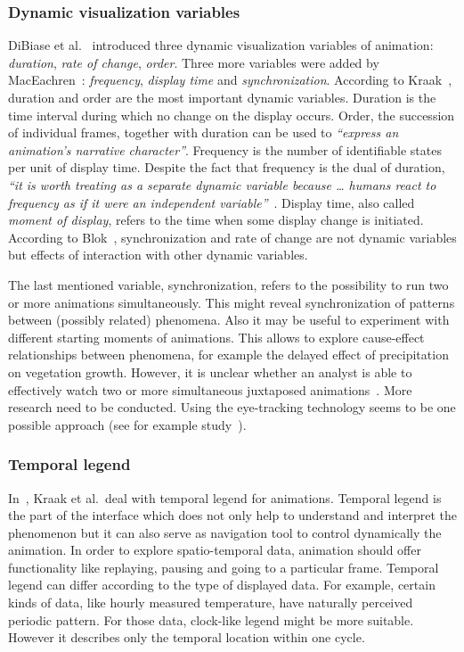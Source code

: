 \documentclass[a4paper,12pt,oneside]{book}
\begin{document}
\subsubsection{Dynamic visualization variables}
\label{sec:dynamicVariables}
DiBiase et al.~\cite{dibiase1992animation} introduced three dynamic visualization variables of animation:
\emph{duration}, \emph{rate of change}, \emph{order}.
Three more variables were added by MacEachren~\cite{maceachren2004maps}:
\emph{frequency}, \emph{display time} and \emph{synchronization}.
According to Kraak~\cite{kraak2000visualisation}, duration and order are the most important
dynamic variables. Duration is the time interval during which no change on the display occurs.
Order, the succession of individual frames, together with duration can be used to
\emph{``express an animation's narrative character''}\cite[p.~31]{kraak2000visualisation}.
Frequency is the number of identifiable states per unit of display time.
Despite the fact that frequency is the dual of duration,
\emph{``it is worth treating as a separate dynamic variable because \ldots
humans react to frequency as if it were an independent variable''}~\cite{kraak1994visualization}.
Display time, also called \emph{moment of display}, refers to the time when some display change is initiated.
According to Blok~\cite{blok2005dynamic}, synchronization and rate of change are not dynamic variables
but effects of interaction with other dynamic variables.

The last mentioned variable, synchronization, refers to the possibility to run two or more
animations simultaneously. This might reveal synchronization of patterns between (possibly related) phenomena.
Also it may be useful to experiment with different starting moments of animations.
This allows to explore cause-effect relationships between phenomena, for example
the delayed effect of precipitation on vegetation growth.
However, it is unclear whether an analyst is able to effectively watch two or more simultaneous
juxtaposed animations~\cite{andrienko2003exploratory}. More research need to be conducted.
Using the eye-tracking technology seems to be one possible approach
(see for example study~\cite{opach2011evaluating}).

\subsubsection{Temporal legend}
In~\cite{kraak1997cartographic}, Kraak et al.\ deal with temporal legend for animations.
Temporal legend is the part of the interface which does not only help to understand and interpret
the phenomenon but it can also serve as navigation tool to control dynamically the animation.
In order to explore spatio-temporal data, animation should offer functionality like replaying, pausing
and going to a particular frame.
Temporal legend can differ according to the type of displayed data.
For example, certain kinds of data, like hourly measured temperature, have naturally perceived periodic pattern.
For those data, clock-like legend might be more suitable.
However it describes only the temporal location within one cycle.
\end{document}
